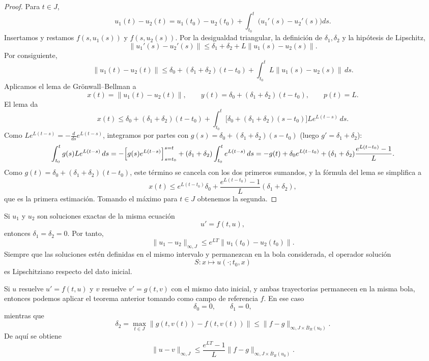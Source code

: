 \begin{proof}
    Para $t\in J$,
    \[
        u_1(t)-u_2(t)
        =u_1(t_0)-u_2(t_0)
        +\int_{t_0}^t\bigl(u_1'(s)-u_2'(s)\bigr)ds.
    \]
    Insertamos y restamos $f(s,u_1(s))$ y $f(s,u_2(s))$. Por la desigualdad triangular, la definición de $\delta_1,\delta_2$ y la hipótesis de Lipschitz,
    \[
        \|u_1'(s)-u_2'(s)\|
        \leq
        \delta_1+\delta_2+L\|u_1(s)-u_2(s)\|.
    \]
    Por consiguiente,
    \[
        \|u_1(t)-u_2(t)\|
        \leq
        \delta_0+(\delta_1+\delta_2)(t-t_0)
        +\int_{t_0}^t L\|u_1(s)-u_2(s)\|\,ds.
    \]
    Aplicamos el lema de Grönwall--Bellman a
    \[
        x(t)=\|u_1(t)-u_2(t)\|,
        \qquad
        y(t)=\delta_0+(\delta_1+\delta_2)(t-t_0),
        \qquad
        p(t)=L.
    \]
    El lema da
    \[
        x(t) \leq \delta_0 + (\delta_1 + \delta_2)(t - t_0) + \int_{t_0}^t \bigl[ \delta_0 + (\delta_1 + \delta_2)(s - t_0) \bigr] L e^{L(t-s)} \, ds.
    \]
    Como $L e^{L(t-s)} = -\frac{d}{ds} e^{L(t-s)}$, integramos por partes con $g(s) = \delta_0 + (\delta_1 + \delta_2)(s - t_0)$ (luego $g' = \delta_1 + \delta_2$):
    \[
        \int_{t_0}^t g(s) L e^{L(t-s)} \, ds = -\Bigl[ g(s) e^{L(t-s)} \Bigr]_{s=t_0}^{s=t} + (\delta_1 + \delta_2) \int_{t_0}^t e^{L(t-s)} \, ds = -g(t) + \delta_0 e^{L(t-t_0)} + (\delta_1 + \delta_2) \frac{e^{L(t-t_0)} - 1}{L}.
    \]
    Como $g(t) = \delta_0 + (\delta_1 + \delta_2)(t - t_0)$, este término se cancela con los dos primeros sumandos, y la fórmula del lema se simplifica a
    \[
        x(t)
        \leq
        e^{L(t-t_0)}\delta_0
        +\frac{e^{L(t-t_0)}-1}{L}(\delta_1+\delta_2),
    \]
    que es la primera estimación. Tomando el máximo para $t\in J$ obtenemos la segunda.
\end{proof}

\begin{observación}
    Si $u_1$ y $u_2$ son soluciones exactas de la misma ecuación
    \[
        u'=f(t,u),
    \]
    entonces $\delta_1=\delta_2=0$. Por tanto,
    \[
        \|u_1-u_2\|_{\infty,J}
        \leq e^{LT}\|u_1(t_0)-u_2(t_0)\|.
    \]
    Siempre que las soluciones estén definidas en el mismo intervalo y permanezcan en la bola considerada, el operador solución
    \[
        S:x\longmapsto u(\cdot;t_0,x)
    \]
    es Lipschitziano respecto del dato inicial.
\end{observación}

\begin{observación}
    Si $u$ resuelve $u'=f(t,u)$ y $v$ resuelve $v'=g(t,v)$ con el mismo dato inicial, y ambas trayectorias permanecen en la misma bola, entonces podemos aplicar el teorema anterior tomando como campo de referencia $f$. En ese caso
    \[
        \delta_0=0,\qquad \delta_1=0,
    \]
    mientras que
    \[
        \delta_2
        =\max_{t\in J}\|g(t,v(t))-f(t,v(t))\|
        \leq\|f-g\|_{\infty,J\times\overline{B}_R(u_0)}.
    \]
    De aquí se obtiene
    \[
        \|u-v\|_{\infty,J}
        \leq
        \frac{e^{LT}-1}{L}
        \|f-g\|_{\infty,J\times\overline{B}_R(u_0)}.
    \]
\end{observación}

